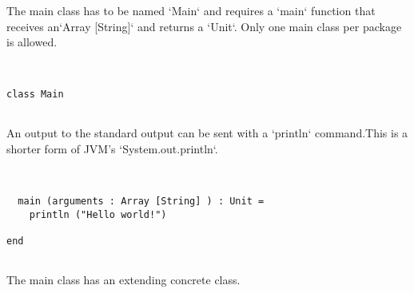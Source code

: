 \documentclass[12pt,a4paper]{article}
\begin{document}
The main class has to be named `Main` and requires a `main` function that receives an`Array [String]` and returns a `Unit`. Only one main class per package is allowed. 


\begin{lstlisting}


class Main


\end{lstlisting}

An output to the standard output can be sent with a `println` command.This is a shorter form of JVM's `System.out.println`. 


\begin{lstlisting}


  main (arguments : Array [String] ) : Unit =
    println ("Hello world!")

end


\end{lstlisting}

The main class has an extending concrete class. 


\begin{lstlisting}


\end{lstlisting}
\end{document}
